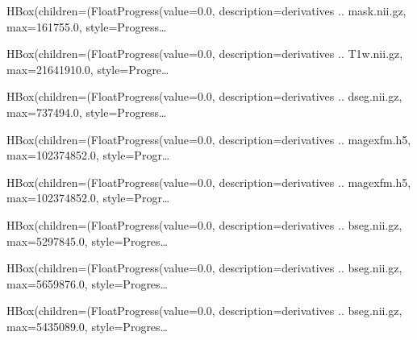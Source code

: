 \documentclass[letterpaper,10pt,english]{sphinxmanual}
\begin{document}
\begin{sphinxVerbatim}[commandchars=\\\{\}]
HBox(children=(FloatProgress(value=0.0, description=\PYGZsq{}derivatives .. mask.nii.gz\PYGZsq{}, max=161755.0, style=Progress…
\end{sphinxVerbatim}

\begin{sphinxVerbatim}[commandchars=\\\{\}]
HBox(children=(FloatProgress(value=0.0, description=\PYGZsq{}derivatives .. \PYGZus{}T1w.nii.gz\PYGZsq{}, max=21641910.0, style=Progre…
\end{sphinxVerbatim}

\begin{sphinxVerbatim}[commandchars=\\\{\}]
HBox(children=(FloatProgress(value=0.0, description=\PYGZsq{}derivatives .. dseg.nii.gz\PYGZsq{}, max=737494.0, style=Progress…
\end{sphinxVerbatim}

\begin{sphinxVerbatim}[commandchars=\\\{\}]
HBox(children=(FloatProgress(value=0.0, description=\PYGZsq{}derivatives .. mage\PYGZus{}xfm.h5\PYGZsq{}, max=102374852.0, style=Progr…
\end{sphinxVerbatim}

\begin{sphinxVerbatim}[commandchars=\\\{\}]
HBox(children=(FloatProgress(value=0.0, description=\PYGZsq{}derivatives .. mage\PYGZus{}xfm.h5\PYGZsq{}, max=102374852.0, style=Progr…
\end{sphinxVerbatim}

\begin{sphinxVerbatim}[commandchars=\\\{\}]
HBox(children=(FloatProgress(value=0.0, description=\PYGZsq{}derivatives .. bseg.nii.gz\PYGZsq{}, max=5297845.0, style=Progres…
\end{sphinxVerbatim}

\begin{sphinxVerbatim}[commandchars=\\\{\}]
HBox(children=(FloatProgress(value=0.0, description=\PYGZsq{}derivatives .. bseg.nii.gz\PYGZsq{}, max=5659876.0, style=Progres…
\end{sphinxVerbatim}

\begin{sphinxVerbatim}[commandchars=\\\{\}]
HBox(children=(FloatProgress(value=0.0, description=\PYGZsq{}derivatives .. bseg.nii.gz\PYGZsq{}, max=5435089.0, style=Progres…
\end{sphinxVerbatim}
\end{document}
